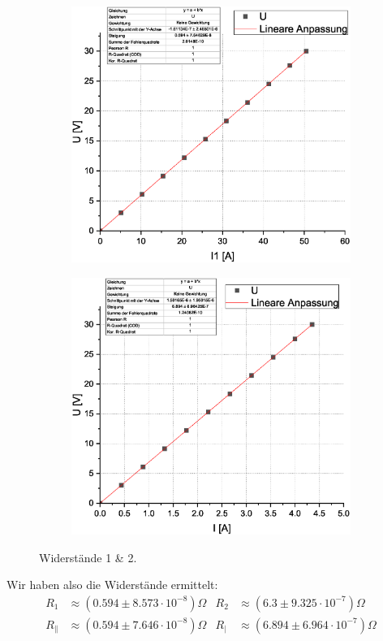 \documentclass[10pt,a4paper]{article}
\begin{document}
\begin{flushleft}
\begin{figure}[H]
\begin{subfigure}[c]{.5\textwidth}
\centering
\includegraphics[scale=0.25]{Rpara}
\label{fig:rpara}
\end{subfigure}%
%
\begin{subfigure}[c]{.5\textwidth}
\centering
\includegraphics[scale=0.25]{Rreihe}
\label{fig:rreihe}
\end{subfigure}%
\caption{Widerstände 1 \& 2.}
\label{fig:wids}
\end{figure}
Wir haben also die Widerstände ermittelt:
\begin{align*}
R_1 &\approx (0.594 \pm 8.573 \cdot 10^{-8}) \Omega & R_2 &\approx (6.3 \pm 9.325 \cdot 10^{-7}) \Omega \\
R_{\parallel} &\approx (0.594 \pm 7.646 \cdot 10^{-8}) \Omega & R_{\mid} &\approx (6.894 \pm 6.964 \cdot 10^{-7}) \Omega
\end{align*}


\end{flushleft}
\end{document}
